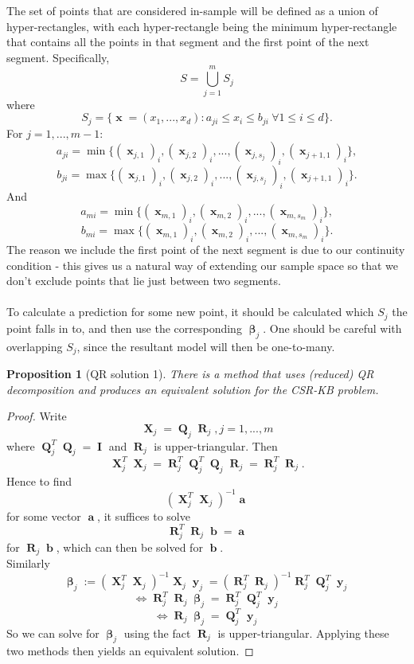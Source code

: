 \documentclass[12pt]{article}
\DeclareMathOperator{\bx}{\mathbf{x}}
\DeclareMathOperator{\bb}{\mathbf{b}}
\DeclareMathOperator{\bX}{\mathbf{X}}
\DeclareMathOperator{\by}{\mathbf{y}}
\DeclareMathOperator{\bQ}{\mathbf{Q}}
\DeclareMathOperator{\bI}{\mathbf{I}}
\DeclareMathOperator{\bR}{\mathbf{R}}
\DeclareMathOperator{\ba}{\mathbf{a}}
\DeclareMathOperator{\bbeta}{\boldsymbol{\beta}}
\newtheorem{prop}{Proposition}
\begin{document}
The set of points that are considered in-sample will be defined as a union of hyper-rectangles, with each hyper-rectangle being the minimum hyper-rectangle that contains all the points in that segment and the first point of the next segment. Specifically,
$$S= \bigcup_{j=1}^m S_j$$
where
$$S_j = \{\bx=(x_1, ..., x_d): a_{ji} \leq x_i \leq b_{ji} \ \forall 1 \leq i \leq d\}.$$
For $j=1, ..., m-1$:
$$a_{ji} = \min\{(\bx_{j, 1})_i, (\bx_{j, 2})_i, ..., (\bx_{j, s_j})_i, (\bx_{j+1, 1})_i\},$$
$$b_{ji} = \max\{(\bx_{j, 1})_i, (\bx_{j, 2})_i, ..., (\bx_{j, s_j})_i, (\bx_{j+1, 1})_i\}.$$
And
$$a_{mi} = \min\{(\bx_{m, 1})_i, (\bx_{m, 2})_i, ..., (\bx_{m, s_m})_i\},$$
$$b_{mi} = \max\{(\bx_{m, 1})_i, (\bx_{m, 2})_i, ..., (\bx_{m, s_m})_i\}.$$
The reason we include the first point of the next segment is due to our continuity condition - this gives us a natural way of extending our sample space so that we don't exclude points that lie just between two segments. \\ \\
To calculate a prediction for some new point, it should be calculated which $S_j$ the point falls in to, and then use the corresponding $\bbeta_j$. One should be careful with overlapping $S_j$, since the resultant model will then be one-to-many.












\begin{prop}[QR solution 1] There is a method that uses (reduced) QR decomposition and produces an equivalent solution for the CSR-KB problem.
\end{prop}
\begin{proof}
Write
$$\bX_j = \bQ_j \bR_j, j=1, ..., m$$
where $\bQ_j^T\bQ_j = \bI$ and $\bR_j$ is upper-triangular. Then
$$\bX_j^T \bX_j = \bR_j^T \bQ_j^T\bQ_j \bR_j = \bR_j^T\bR_j .$$
Hence to find 
$$(\bX_j^T \bX_j)^{-1} \ba$$
for some vector $\ba$, it suffices to solve
$$\bR_j^T \bR_j \bb = \ba$$
for $\bR_j \bb$, which can then be solved for $\bb$. \\
Similarly
$$\bbeta_j := (\bX_j^T \bX_j)^{-1} \bX_j \by_j = (\bR_j^T \bR_j)^{-1} \bR_j^T \bQ_j^T \by_j$$
$$\iff \bR_j^T \bR_j\bbeta_j = \bR_j^T \bQ_j^T \by_j$$
$$\iff \bR_j\bbeta_j = \bQ_j^T \by_j$$
So we can solve for $\bbeta_j$ using the fact $\bR_j$ is upper-triangular. Applying these two methods then yields an equivalent solution.
\end{proof}
\end{document}
